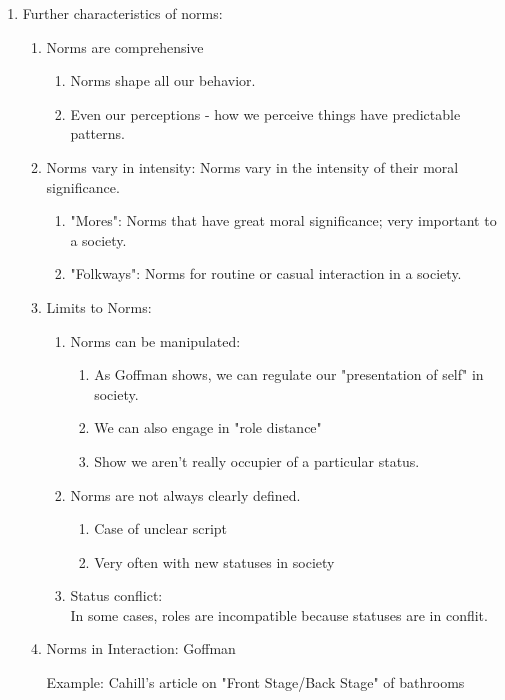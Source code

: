 \documentclass[12pt,a4paper]{article}
\begin{document}
\begin{enumerate}
\begin{enumerate}
\begin{enumerate}
		\end{enumerate}
	\end{enumerate}
	\item Further characteristics of norms: 
	\begin{enumerate}
		\item Norms are comprehensive
		\begin{enumerate}
			\item Norms shape all our behavior.
			\item Even our perceptions - how we perceive things have predictable patterns. 
		\end{enumerate}
		\item Norms vary in intensity: Norms vary in the intensity of their moral significance.  
		\begin{enumerate}
			\item "Mores": Norms that have great moral significance; very important to a society. 
			\item "Folkways": Norms for routine or casual interaction in a society. 
		\end{enumerate}
		\item Limits to Norms: 
		\begin{enumerate}
			\item Norms can be manipulated: 
			\begin{enumerate}
				\item As Goffman shows, we can regulate our "presentation of self" in society. 
				\item We can also engage in "role distance"
				\item Show we aren't really occupier of a particular status. 
			\end{enumerate}
			\item Norms are not always clearly defined. 
			\begin{enumerate}
				\item Case of unclear script
				\item Very often with new statuses in society
			\end{enumerate}
			\item Status conflict: \\
			In some cases, roles are incompatible because statuses are in conflit. 
	\end{enumerate}
	\item Norms in Interaction: Goffman
	\begin{eg}{Example: Cahill's article on "Front Stage/Back Stage" of bathrooms}
	\begin{enumerate}

\end{enumerate}
\end{eg}
\end{enumerate}
\end{enumerate}
\end{document}
